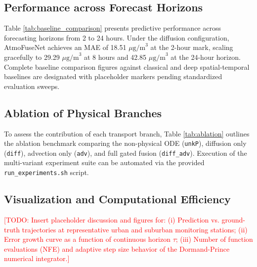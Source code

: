 \documentclass[conference]{IEEEtran}
\begin{document}
\subsection{Performance across Forecast Horizons}
Table \ref{tab:baseline_comparison} presents predictive performance across forecasting horizons from 2 to 24 hours. Under the diffusion configuration, AtmoFuseNet achieves an MAE of 18.51 $\mu\text{g/m}^3$ at the 2-hour mark, scaling gracefully to 29.29 $\mu\text{g/m}^3$ at 8 hours and 42.85 $\mu\text{g/m}^3$ at the 24-hour horizon. Complete baseline comparison figures against classical and deep spatial-temporal baselines are designated with placeholder markers pending standardized evaluation sweeps.

\subsection{Ablation of Physical Branches}
To assess the contribution of each transport branch, Table \ref{tab:ablation} outlines the ablation benchmark comparing the non-physical ODE (\texttt{unkP}), diffusion only (\texttt{diff}), advection only (\texttt{adv}), and full gated fusion (\texttt{diff\_adv}). Execution of the multi-variant experiment suite can be automated via the provided \texttt{run\_experiments.sh} script.

\subsection{Visualization and Computational Efficiency}
\textcolor{red}{[TODO: Insert placeholder discussion and figures for: (i) Prediction vs. ground-truth trajectories at representative urban and suburban monitoring stations; (ii) Error growth curve as a function of continuous horizon $\tau$; (iii) Number of function evaluations (NFE) and adaptive step size behavior of the Dormand-Prince numerical integrator.]}
\end{document}
